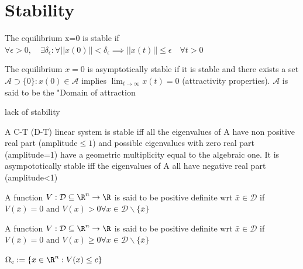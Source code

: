 \documentclass[english]{lectures}
\begin{document}
\chapter{Stability}
\begin{definition}
    The equilibrium x=0 is stable if $\forall \epsilon>0, \quad \exists \delta_{\epsilon}:\forall ||x(0)||<\delta_{\epsilon}\implies ||x(t)||\leq \epsilon \quad \forall t>0$
\end{definition}
\begin{definition}
    The equilibrium $x=0$ is asymptotically stable if it is stable and there exists a set $\mathcal{A} \supset \{0\}:x(0) \in \mathcal{A}$ implies $\lim_{t \to \infty}x(t)=0$ (attractivity properties). $\mathcal{A}$ is said to be the "Domain of attraction
\end{definition}
\begin{definition}[instability]
    lack of stability
\end{definition}
\begin{theorem}
    A C-T (D-T) linear system is stable iff all the eigenvalues of A have non positive real part (amplitude$\leq 1$) and possible eigenvalues with zero real part (amplitude=1) have a geometric multiplicity equal to the algebraic one. It is asympototically stable iff the eigenvalues of A all have negative real part (amplitude<1)
\end{theorem}
\begin{definition}
    A function $V:\mathcal{D}\subseteq \R^n \to \R$ is said to be positive definite wrt $\bar{x} \in \mathcal{D}$ if $V(\bar{x})=0$ and $V(x)>0 \forall x \in \mathcal{D} \backslash \{\bar{x}\}$
\end{definition}
\begin{definition}
    A function $V:\mathcal{D}\subseteq \R^n \to \R$ is said to be positive definite wrt $\bar{x} \in \mathcal{D}$ if $V(\bar{x})=0$ and $V(x)\geq 0 \forall x \in \mathcal{D} \backslash \{\bar{x}\}$
\end{definition}
\begin{definition}
    $\Omega_c := \{x\in \R^n : V(x)\leq c\}$
\end{definition}
\end{document}
